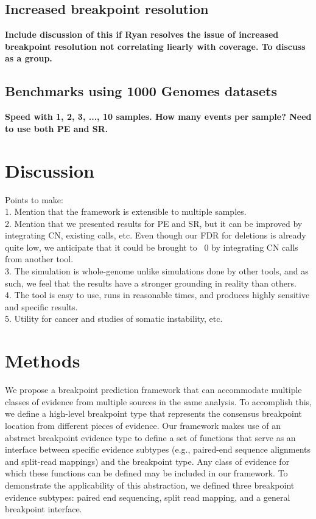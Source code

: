 \documentclass[11pt]{article}
\begin{document}
\subsection{Increased breakpoint resolution}
\textbf{Include discussion of this if Ryan resolves the issue of increased
breakpoint resolution not correlating liearly with coverage.  To discuss as a 
group.}


\subsection{Benchmarks using 1000 Genomes datasets}
\textbf{Speed with 1, 2, 3, ..., 10 samples.  How many events per sample?
Need to use both PE and SR.}



\section{Discussion}
Points to make:\\
1. Mention that the framework is extensible to multiple samples. \\
2. Mention that we presented results for PE and SR, but it can be 
improved by integrating CN, existing calls, etc.  Even though our FDR for 
deletions is already quite low, we anticipate that it could be brought to ~0
by integrating CN calls from another tool.\\
3. The simulation is whole-genome unlike simulations done by other tools, 
and as such, we feel that the results have a stronger grounding in reality
than others.\\
4. The tool is easy to use, runs in reasonable times, and produces highly
sensitive and specific results.\\
5. Utility for cancer and studies of somatic instability, etc.\\



\section{Methods}

We propose a breakpoint prediction framework that can accommodate multiple
classes of evidence from multiple sources in the same analysis.  To accomplish
this, we define a high-level breakpoint type that represents the consensus
breakpoint location from different pieces of evidence.  Our framework makes use
of an abstract breakpoint evidence type to define a set of functions that serve
as an interface between specific evidence subtypes (e.g., paired-end sequence
alignments and split-read mappings) and the breakpoint type.  Any class of
evidence for which these functions can be defined may be included in our
framework.  To demonstrate the applicability of this abstraction, we defined
three breakpoint evidence subtypes: paired end sequencing, split read mapping,
and a general breakpoint interface. 
\end{document}
